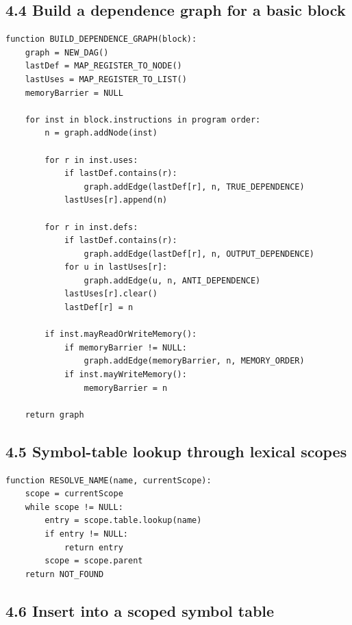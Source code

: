 \documentclass[10pt,letterpaper]{article}
\begin{document}
\subsection*{4.4 Build a dependence graph for a basic block}

\begin{verbatim}
function BUILD_DEPENDENCE_GRAPH(block):
    graph = NEW_DAG()
    lastDef = MAP_REGISTER_TO_NODE()
    lastUses = MAP_REGISTER_TO_LIST()
    memoryBarrier = NULL

    for inst in block.instructions in program order:
        n = graph.addNode(inst)

        for r in inst.uses:
            if lastDef.contains(r):
                graph.addEdge(lastDef[r], n, TRUE_DEPENDENCE)
            lastUses[r].append(n)

        for r in inst.defs:
            if lastDef.contains(r):
                graph.addEdge(lastDef[r], n, OUTPUT_DEPENDENCE)
            for u in lastUses[r]:
                graph.addEdge(u, n, ANTI_DEPENDENCE)
            lastUses[r].clear()
            lastDef[r] = n

        if inst.mayReadOrWriteMemory():
            if memoryBarrier != NULL:
                graph.addEdge(memoryBarrier, n, MEMORY_ORDER)
            if inst.mayWriteMemory():
                memoryBarrier = n

    return graph
\end{verbatim}

\subsection*{4.5 Symbol-table lookup through lexical scopes}

\begin{verbatim}
function RESOLVE_NAME(name, currentScope):
    scope = currentScope
    while scope != NULL:
        entry = scope.table.lookup(name)
        if entry != NULL:
            return entry
        scope = scope.parent
    return NOT_FOUND
\end{verbatim}

\subsection*{4.6 Insert into a scoped symbol table}
\end{document}
